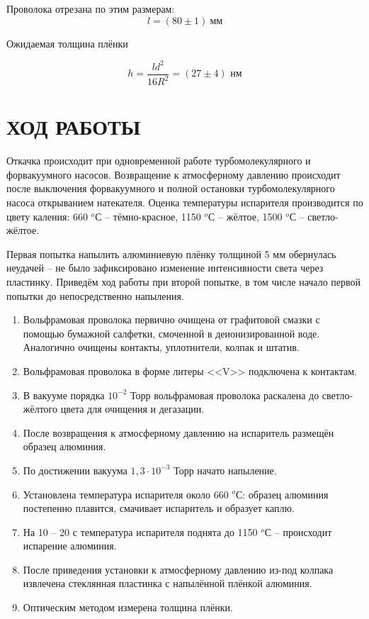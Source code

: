 \documentclass[a4paper, 14pt]{extarticle}
\begin{document}
		Проволока отрезана по этим размерам: \[ l = (80 \pm 1) \ \text{мм} \] 
		
		Ожидаемая толщина плёнки
		
		\begin{equation}
			h =  \frac{l d^2}{16 R^2} = (27 \pm 4)  \text{ нм} 
		\end{equation}
		
		
	\section{ХОД РАБОТЫ}
	
		\hspace{11mm}Откачка происходит при одновременной работе турбомолекулярного и форвакуумного насосов. Возвращение к атмосферному давлению происходит после выключения форвакуумного и полной остановки турбомолекулярного насоса открыванием натекателя. Оценка температуры испарителя производится по цвету каления: 660 $^o$С -- тёмно-красное, 1150 $^o$С -- жёлтое, 1500 $^o$С -- светло-жёлтое.
		
		Первая попытка напылить алюминиевую плёнку толщиной 5 мм обернулась неудачей -- не было зафиксировано изменение интенсивности света через пластинку. Приведём ход работы при второй попытке, в том числе начало первой попытки до непосредственно напыления. 
	
	\begin{enumerate}
		\item Вольфрамовая проволока первично очищена от графитовой смазки с помощью бумажной салфетки, смоченной в деионизированной воде. Аналогично очищены контакты, уплотнители, колпак и штатив.
		
		\item  Вольфрамовая проволока в форме литеры <<V>> подключена к контактам. 
		
		\item  В вакууме порядка $10^{-2}$ Торр вольфрамовая проволока раскалена до светло-жёлтого цвета для очищения и дегазации.
		
		\item После возвращения к атмосферному давлению на испаритель размещён образец алюминия.
		
		\item  По достижении вакуума $1,3 \cdot 10^{-3}$ Торр начато напыление.
		
		\item  Установлена температура испарителя около 660 $^o$С: образец алюминия постепенно плавится, смачивает испаритель и образует каплю.
		
		\item  На 10 -- 20 с температура испарителя поднята до 1150 $^o$С -- происходит испарение алюминия.
		
		\item  После приведения установки к атмосферному давлению из-под колпака извлечена стеклянная пластинка с напылённой плёнкой алюминия.
		
		\item  Оптическим методом измерена толщина плёнки.
		
	\end{enumerate} 
		
\end{document}
